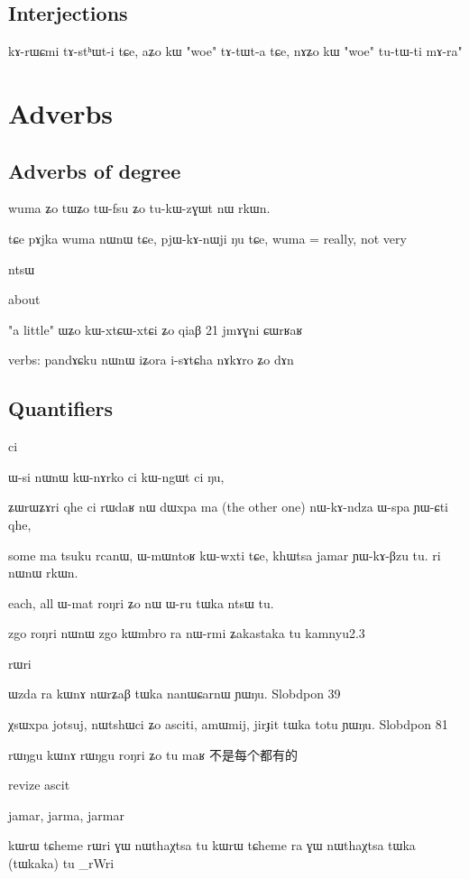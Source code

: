 \documentclass[oldfontcommands,oneside,a4paper,11pt]{memoir}
\newcommand{\ipa}[1]{{\phon #1}} %
\newcommand{\wav}[1]{}%
\begin{document}
\section{Interjections}

kɤ-rɯɕmi tɤ-stʰɯt-i tɕe, aʑo kɯ "woe" tɤ-tɯt-a tɕe, nɤʑo kɯ "woe" tu-tɯ-ti mɤ-ra"
\wav{reponse-oe}
\chapter{Adverbs} \label{chapt:adv}
\section{Adverbs of degree} \label{adv:degree}
wuma ʑo tɯʑo tɯ-fsu ʑo tu-kɯ-zɣɯt nɯ rkɯn.

tɕe pɤjka wuma nɯnɯ tɕe, pjɯ-kɤ-nɯji ŋu tɕe,
wuma = really, not very

ntsɯ


about

"a little"
ɯʑo kɯ-xtɕɯ-xtɕi ʑo qiaβ
21  jmɤɣni ɕɯrʁaʁ

verbs:
pandɤɕku nɯnɯ iʑora i-sɤtɕha nɤkɤro ʑo dɤn 

\section{Quantifiers}
ci

ɯ-si nɯnɯ kɯ-nɤrko ci kɯ-ngɯt ci ŋu,

ʑɯrɯʑɤri qhe ci rɯdaʁ nɯ dɯxpa ma (the other one)
nɯ-kɤ-ndza ɯ-spa ɲɯ-ɕti qhe,

some
ma tsuku rcanɯ, ɯ-mɯntoʁ kɯ-wxti tɕe, khɯtsa jamar ɲɯ-kɤ-βzu tu.
ri nɯnɯ rkɯn.


each, all
ɯ-mat roŋri ʑo nɯ ɯ-ru tɯka ntsɯ tu.

zgo roŋri nɯnɯ zgo kɯmbro ra nɯ-rmi ʑakastaka tu
kamnyu2.3

rɯri

ɯzda ra kɯnɤ nɯrʑaβ tɯka nanɯɕarnɯ ɲɯŋu.
Slobdpon 39

χsɯxpa jotsuj, nɯtshɯci ʑo asciti, amɯmij, jirɟit tɯka totu ɲɯŋu.
Slobdpon 81

rɯŋgu kɯnɤ rɯŋgu roŋri ʑo tu maʁ
不是每个都有的

revize ascit


\ipa{jamar}, \ipa{jarma}, \ipa{jarmar}





kɯrɯ tɕheme rɯri ɣɯ nɯthaχtsa tu
kɯrɯ tɕheme ra ɣɯ nɯthaχtsa tɯka (tɯkaka) tu
\ipa{8_rWri}
\end{document}
